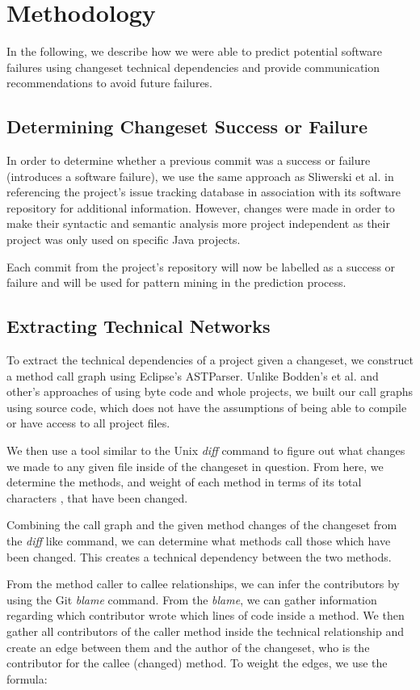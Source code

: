 \documentclass[conference]{IEEEtran}
\begin{document}
\section{Methodology}
In the following, we describe how we were able to predict potential software failures using changeset
technical dependencies and provide communication recommendations to avoid future failures.

\subsection{Determining Changeset Success or Failure}
In order to determine whether a previous commit was a success or failure (introduces a software
failure), we use the same approach as Sliwerski et al. \cite{Sliwerski:2005:CIF} in referencing 
the project's issue tracking database in association with its software repository for additional 
information. However, changes were made in order to make their syntactic  and semantic analysis 
more project independent as their project was only used on specific Java projects. 

Each commit from the project's repository will now be labelled as a success
or failure and will be used for pattern mining in the prediction process.

\subsection{Extracting Technical Networks}
To extract the technical dependencies of a project given a changeset, we construct a method
call graph using Eclipse's ASTParser. 
Unlike  Bodden's et al. \cite{Bodden:2003:HVJ} and other's approaches of using byte code
and whole projects, we built our call graphs using source code, which does not have the assumptions
of being able to compile or have access to all project files.

We then use a tool similar to the Unix \textit{diff} command to figure out what changes we made 
to any given file inside of the changeset in question. From here, we determine the methods, 
and weight of each method in terms of its total characters , that have been changed.

Combining the call graph and the given method changes of the changeset from the \textit{diff} like 
command,  we can determine what methods call those which have been changed. This creates a 
technical dependency between the two methods.

From the method caller to callee relationships, we can infer the contributors by using
the Git \textit{blame} command. From the \textit{blame}, we can gather information regarding which 
contributor  wrote which lines of code inside a method. We then gather all contributors of the 
caller method inside the technical relationship and create an edge between them and 
the author of the changeset, who is the contributor for the 
callee (changed) method. To weight the edges, we use the formula:
\end{document}
